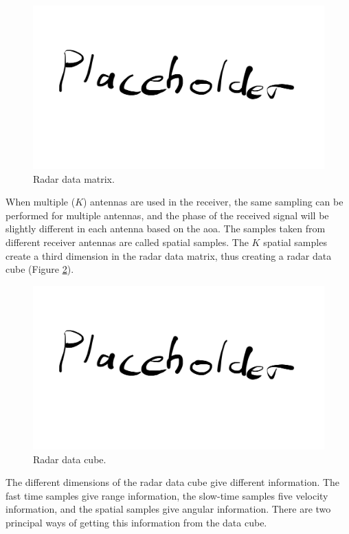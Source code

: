 \begin{figure}
    \centering
    \includegraphics[width=\textwidth]{fig/placeholder.png}
    \caption{Radar data matrix.}
    \label{fig:radar_matrix}
\end{figure}

When multiple ($K$) antennas are used in the receiver,
the same sampling can be performed for multiple antennas,
and the phase of the received signal will be slightly different in each antenna
based on the \gls{aoa}.
The samples taken from different receiver antennas are called spatial samples.
The $K$ spatial samples create a third dimension in the radar data matrix,
thus creating a radar data cube (Figure \ref{fig:radar_cube}).

\begin{figure}
    \centering
    \includegraphics[width=\textwidth]{fig/placeholder.png}
    \caption{Radar data cube.}
    \label{fig:radar_cube}
\end{figure}

The different dimensions of the radar data cube give different information.
The fast time samples give range information,
the slow-time samples five velocity information,
and the spatial samples give angular information.
There are two principal ways of getting this information from the data cube.

